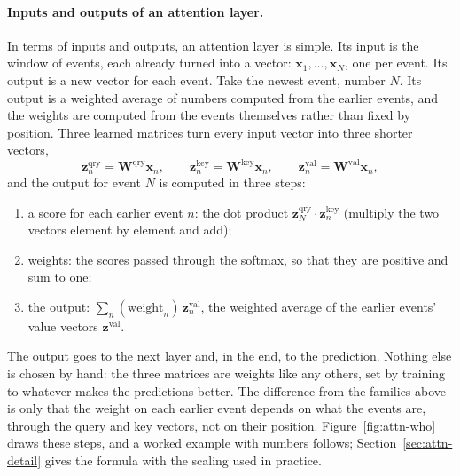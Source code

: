 \paragraph{Inputs and outputs of an attention layer.} In terms of inputs and outputs, an attention layer is simple. Its input
is the window of events, each already turned into a vector: $\mathbf{x}_1, \dots, \mathbf{x}_N$, one per event. Its
output is a new vector for each event. Take the newest event, number $N$. Its output is a weighted average of
numbers computed from the earlier events, and the weights are computed from the events themselves rather than fixed
by position. Three learned matrices turn every input vector into three shorter vectors,
\[
  \mathbf{z}^{\text{qry}}_n = \mathbf{W}^{\text{qry}}\mathbf{x}_n, \qquad
  \mathbf{z}^{\text{key}}_n = \mathbf{W}^{\text{key}}\mathbf{x}_n, \qquad
  \mathbf{z}^{\text{val}}_n = \mathbf{W}^{\text{val}}\mathbf{x}_n ,
\]
and the output for event $N$ is computed in three steps:
\begin{enumerate}[leftmargin=1.8em,itemsep=1pt]
\item a score for each earlier event $n$: the dot product $\mathbf{z}^{\text{qry}}_N \cdot \mathbf{z}^{\text{key}}_n$ (multiply the two vectors
  element by element and add);
\item weights: the scores passed through the softmax, so that they are positive and sum to one;
\item the output: $\sum_n (\text{weight}_n)\, \mathbf{z}^{\text{val}}_n$, the weighted average of the earlier events'
  value vectors $\mathbf{z}^{\text{val}}$.
\end{enumerate}
The output goes to the next layer and, in the end, to the prediction. Nothing else is chosen by hand: the three
matrices are weights like any others, set by training to whatever makes the predictions better. The difference from
the families above is only that the weight on each earlier event depends on what the events are, through
the query and key vectors, not on their position. Figure~\ref{fig:attn-who} draws these steps, and a
worked example with numbers follows; Section~\ref{sec:attn-detail} gives the formula with the scaling used in
practice.

